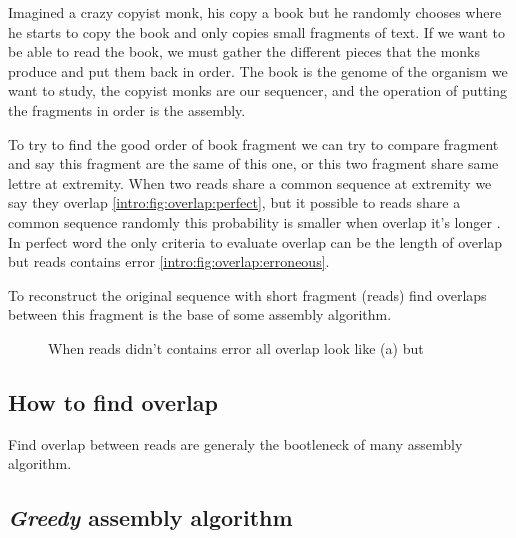 \documentclass[main.tex]{subfiles}
\begin{document}
Imagined a crazy copyist monk, his copy a book but he randomly chooses where he starts to copy the book and only copies small fragments of text.
If we want to be able to read the book, we must gather the different pieces that the monks produce and put them back in order.
The book is the genome of the organism we want to study, the copyist monks are our sequencer, and the operation of putting the fragments in order is the assembly.

To try to find the good order of book fragment we can try to compare fragment and say this fragment are the same of this one, or this two fragment share same lettre at extremity. When two reads share a common sequence at extremity we say they overlap \ref{intro:fig:overlap:perfect}, but it possible to reads share a common sequence randomly this probability is smaller when overlap it's longer %
. In perfect word the only criteria to evaluate overlap can be the length of overlap but reads contains error \ref{intro:fig:overlap:erroneous}.

To reconstruct the original sequence with short fragment (reads) find overlaps between this fragment is the base of some assembly algorithm.

\begin{figure}
    \centering
    \caption{When reads didn't contains error all overlap look like (a) but}
    \label{intro:fig:overlap}
\end{figure}

\subsection{How to find overlap}

Find overlap between reads are generaly the bootleneck of many assembly algorithm.

\subsection{\textit{Greedy} assembly algorithm}

\end{document}
